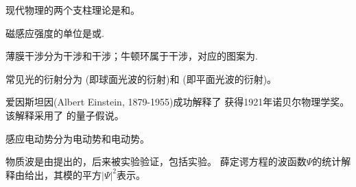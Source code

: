 \documentclass{njustexam}
\begin{document}
\begin{problem}
  现代物理的两个支柱理论是和。
\end{problem}


\begin{problem}
磁感应强度的单位是或. 
\end{problem}


\begin{problem}
薄膜干涉分为干涉和干涉；牛顿环属于干涉，对应的图案为. 
\end{problem}

\begin{problem}
  常见光的衍射分为 (即球面光波的衍射)和 (即平面光波的衍射)。
 \end{problem}

\begin{problem}
爱因斯坦因(Albert Einstein, 1879-1955)成功解释了 获得1921年诺贝尔物理学奖。该解释采用了
的量子假说。
\end{problem}

\begin{problem}
感应电动势分为电动势和电动势。 
\end{problem}





\begin{problem}
  物质波是由提出的，后来被实验验证，包括实验。
  薛定谔方程的波函数$\Psi$的统计解释由给出，其模的平方$|\Psi|^2$表示。 
\end{problem}
\end{document}
